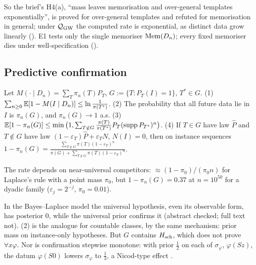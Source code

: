 \noindent So the brief's H4(a), ``mass leaves memorisation and over-general templates exponentially'', is proved for over-general templates and refuted for memorisation in general; under $\mathcal{Q}_{\mathrm{GW}}$ the computed rate is exponential, as distinct data grow linearly (). E1 tests only the single memoriser $\mathrm{Mem}(D_n)$; every fixed memoriser dies under well-specification ().

\subsection{Predictive confirmation}\label{sec:univ:confirm}

\begin{theorem}\label{thm:univ:confirm}
Let $M(\cdot\mid D_n)=\sum_T\pi_n(T)P_T$, $G:=\{T:P_T(I)=1\}$, $T^*\in G$. \textup{(1)} $\sum_{n\ge0}\mathbb{E}[1-M(I\mid D_n)]\le\ln\frac1{\pi(T^*)}$. \textup{(2)} The probability that all future data lie in $I$ is $\pi_n(G)$, and $\pi_n(G)\to1$ a.s. \textup{(3)} $\mathbb{E}[1-\pi_n(G)]\le\min\big(1,\sum_{T\notin G}\frac{\pi(T)}{\pi(T^*)}P_T(\operatorname{supp}P_{T^*})^n\big)$. \textup{(4)} If $T\in G$ have law $\hat P$ and $T\notin G$ have law $(1-\varepsilon_T)\hat P+\varepsilon_TN$, $N(I)=0$, then on instance sequences $1-\pi_n(G)=\frac{\sum_{T\notin G}\pi(T)(1-\varepsilon_T)^n}{\pi(G)+\sum_{T\notin G}\pi(T)(1-\varepsilon_T)^n}$.
\end{theorem}

\noindent The rate depends on near-universal competitors: $\approx(1-\pi_0)/(\pi_0n)$ for Laplace's rule with a point mass $\pi_0$, but $1-\pi_n(G)=0.37$ at $n=10^{50}$ for a dyadic family ($\varepsilon_j=2^{-j}$, $\pi_0=0.01$).

\begin{remark}\label{rem:univ:hutter}
In the Bayes--Laplace model the universal hypothesis, even its observable form, has posterior $0$, while the universal prior confirms it \citep{hutter2007universal} (abstract checked; full text not). (2) is the analogue for countable classes, by the same mechanism: prior mass on instance-only hypotheses. But $G$ contains $H_{\mathrm{sch}}$, which does not prove $\forall x\varphi$. Nor is confirmation stepwise monotone: with prior $\tfrac12$ on each of $\sigma_\varphi$, $\varphi(Sz)$, the datum $\varphi(S0)$ lowers $\sigma_\varphi$ to $\tfrac13$, a Nicod-type effect \citep{leike2015solomonoff}.
\end{remark}

